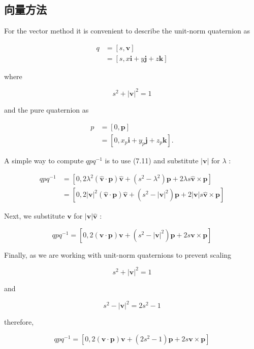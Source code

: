 \subsection{向量方法}
For the vector method it is convenient to describe the unit-norm quaternion as

$$
\begin{aligned}
q & =[s, \mathbf{v}] \\
& =[s, x \mathbf{i}+y \mathbf{j}+z \mathbf{k}]
\end{aligned}
$$

where

$$
s^{2}+|\mathbf{v}|^{2}=1
$$

and the pure quaternion as

$$
\begin{aligned}
p & =[0, \mathbf{p}] \\
& =\left[0, x_{p} \mathbf{i}+y_{p} \mathbf{j}+z_{p} \mathbf{k}\right] .
\end{aligned}
$$

A simple way to compute $q p q^{-1}$ is to use (7.11) and substitute $|\mathbf{v}|$ for $\lambda$ :

$$
\begin{aligned}
q p q^{-1} & =\left[0,2 \lambda^{2}(\hat{\mathbf{v}} \cdot \mathbf{p}) \hat{\mathbf{v}}+\left(s^{2}-\lambda^{2}\right) \mathbf{p}+2 \lambda s \hat{\mathbf{v}} \times \mathbf{p}\right] \\
& =\left[0,2|\mathbf{v}|^{2}(\hat{\mathbf{v}} \cdot \mathbf{p}) \hat{\mathbf{v}}+\left(s^{2}-|\mathbf{v}|^{2}\right) \mathbf{p}+2|\mathbf{v}| s \hat{\mathbf{v}} \times \mathbf{p}\right]
\end{aligned}
$$

Next, we substitute $\mathbf{v}$ for $|\mathbf{v}| \hat{\mathbf{v}}$ :

$$
q p q^{-1}=\left[0,2(\mathbf{v} \cdot \mathbf{p}) \mathbf{v}+\left(s^{2}-|\mathbf{v}|^{2}\right) \mathbf{p}+2 s \mathbf{v} \times \mathbf{p}\right]
$$

Finally, as we are working with unit-norm quaternions to prevent scaling

$$
s^{2}+|\mathbf{v}|^{2}=1
$$

and

$$
s^{2}-|\mathbf{v}|^{2}=2 s^{2}-1
$$

therefore,

$$
q p q^{-1}=\left[0,2(\mathbf{v} \cdot \mathbf{p}) \mathbf{v}+\left(2 s^{2}-1\right) \mathbf{p}+2 s \mathbf{v} \times \mathbf{p}\right]
$$

